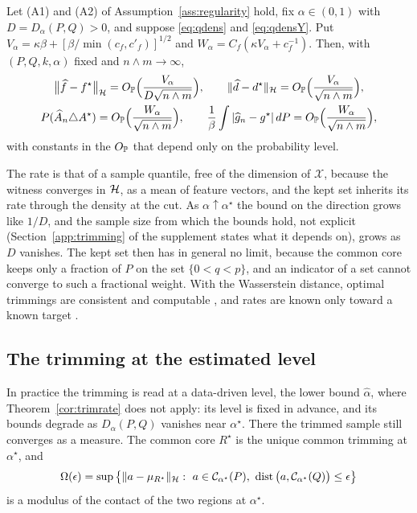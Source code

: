 \begin{theorem}
\label{cor:trimrate}
Let (A1) and (A2) of Assumption~\ref{ass:regularity} hold, fix $\alpha\in(0,1)$ with $D=D_\alpha(P,Q)>0$, and suppose
\eqref{eq:qdens} and \eqref{eq:qdensY}. Put $V_\alpha=\kappa\beta+[\beta/\min(c_f,c'_f)]^{1/2}$ and
$W_\alpha=C_f(\kappa V_\alpha+c_f^{-1})$. Then, with $(P,Q,k,\alpha)$ fixed and $n\wedge m\to\infty$,
\begin{gather*}
\big\|\widehat f-f^\star\big\|_{\mathcal{H}}=O_{\mathbb{P}}\Big(\frac{V_\alpha}{D\sqrt{n\wedge m}}\Big),
\qquad
\|\widehat d-d^\star\|_{\mathcal{H}}=O_{\mathbb{P}}\Big(\frac{V_\alpha}{\sqrt{n\wedge m}}\Big),\\
P(\widehat A_n\triangle A^\star)=O_{\mathbb{P}}\Big(\frac{W_\alpha}{\sqrt{n\wedge m}}\Big),
\qquad
\frac1\beta\int|\widehat g_n-g^\star|\,dP=O_{\mathbb{P}}\Big(\frac{W_\alpha}{\sqrt{n\wedge m}}\Big),
\end{gather*}
with constants in the $O_{\mathbb{P}}$ that depend only on the probability level.
\end{theorem}

The rate is that of a sample quantile, free of the dimension of $\mathcal X$, because the witness converges in $\mathcal{H}$,
as a mean of feature vectors, and the kept set inherits its rate through the density at the cut. As
$\alpha\uparrow\alpha^\star$ the bound on the direction grows like $1/D$, and the sample size from which the bounds hold,
not explicit (Section~\ref{app:trimming} of the supplement states what it depends on), grows as $D$ vanishes. The kept set then has in general no limit, because the common
core keeps only a fraction of $P$ on the set $\{0<q<p\}$, and an indicator of a set cannot converge to such a
fractional weight. With the Wasserstein distance, optimal trimmings are consistent and computable
\citep{alvarez2011incomplete,agullo2018trimming}, and rates are known only toward a known target
\citep{delbarrio2013rates}.

\subsection{The trimming at the estimated level}
\label{sec:trimest}

In practice the trimming is read at a data-driven level, the lower bound $\widehat\alpha$, where
Theorem~\ref{cor:trimrate} does not apply: its level is fixed in advance, and its bounds degrade as $D_\alpha(P,Q)$
vanishes near $\alpha^\star$. There the trimmed sample still converges as a measure. The common core $R^\star$ is the unique common
trimming at $\alpha^\star$, and
\[
\Omega(\epsilon)=\sup\big\{\|a-\mu_{R^\star}\|_\Hh:\ a\in\mathcal C_{\alpha^\star}(P),\
\dist\big(a,\mathcal C_{\alpha^\star}(Q)\big)\le\epsilon\big\}
\]
is a modulus of the contact of the two regions at $\alpha^\star$.

